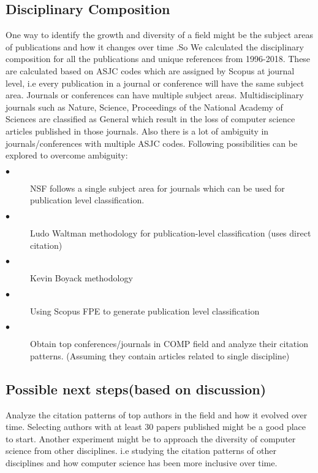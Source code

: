 \documentclass[11pt, oneside]{article}   	%
\begin{document}
\subsection{Disciplinary Composition} One way to identify the growth and diversity of a field might be the subject areas of publications and how it changes over time .So We  calculated the disciplinary composition for all the publications and unique references from 1996-2018. These are calculated based on ASJC codes which are assigned by Scopus at journal level, i.e every publication in a journal or conference will have the same subject area. Journals or conferences can have multiple subject areas. Multidisciplinary journals such as Nature, Science, Proceedings of the National Academy of Sciences are classified as General which result in the loss of computer science articles published in those journals. Also there is a lot of ambiguity in journals/conferences with multiple ASJC codes. Following possibilities can be explored to overcome ambiguity:

\begin{description}
\item[$\bullet$ ] NSF follows a single subject area for journals which can be used for publication level classification.
\item[$\bullet$ ] Ludo Waltman methodology for publication-level classification (uses direct citation)
\item[$\bullet$ ] Kevin Boyack methodology 
\item[$\bullet$ ] Using Scopus FPE to generate publication level classification
\item[$\bullet$ ] Obtain top conferences/journals in COMP field and analyze their citation patterns. (Assuming they contain articles related to single discipline)
\end{description}

\subsection{Possible next steps(based on discussion)}  Analyze the citation patterns of top authors in the field and how it evolved over time. Selecting authors with at least 30 papers published might be a good place to start. Another experiment might be to approach the diversity of computer science from other disciplines. i.e studying the citation patterns of other disciplines and how computer science has been more inclusive over time.
\end{document}
